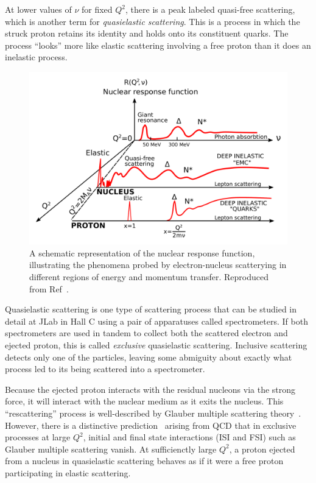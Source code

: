 At lower values of $\nu$ for fixed $Q^2$, there is a peak labeled
quasi-free scattering, which is another term for \textit{quasielastic
scattering}.
This is a process in which the struck proton retains its identity and holds
onto its constituent quarks.
The process ``looks'' more like elastic scattering involving a free proton than
it does an inelastic process.

\begin{figure}[!h]
    \centering
    \includegraphics[width=1.0\textwidth]{chap1/nuclear_response_function_new.pdf}
    \caption{
             A schematic representation of the nuclear response function,
             illustrating the phenomena probed by electron-nucleus scatterying
             in different regions of energy and momentum transfer.
             Reproduced from Ref~\cite{Frois_1985}.
            }
    \label{fig:nuclear_response_function}
\end{figure}

Quasielastic scattering is one type of scattering process that can be studied
in detail at JLab in Hall C using a pair of apparatuses called spectrometers.
If both spectrometers are used in tandem to collect both the scattered electron
and ejected proton, this is called \textit{exclusive} quasielastic scattering.
Inclusive scattering detects only one of the particles, leaving some abmiguity
about exactly what process led to its being scattered into a spectrometer.


Because the ejected proton interacts with the residual nucleons via the strong
force, it will interact with the nuclear medium as it exits the nucleus.
This ``rescattering'' process is well-described by Glauber multiple scattering
theory~\cite{Glauber_1959}.
However, there is a distinctive prediction~\cite{Mueller_1982,Brodsky_1982}
arising from QCD that in exclusive processes at large $Q^2$, initial and final
state interactions (ISI and FSI) such as Glauber multiple scattering vanish.
At sufficienctly large $Q^2$, a proton ejected from a nucleus in quasielastic
scattering behaves as if it were a free proton participating in elastic
scattering.
